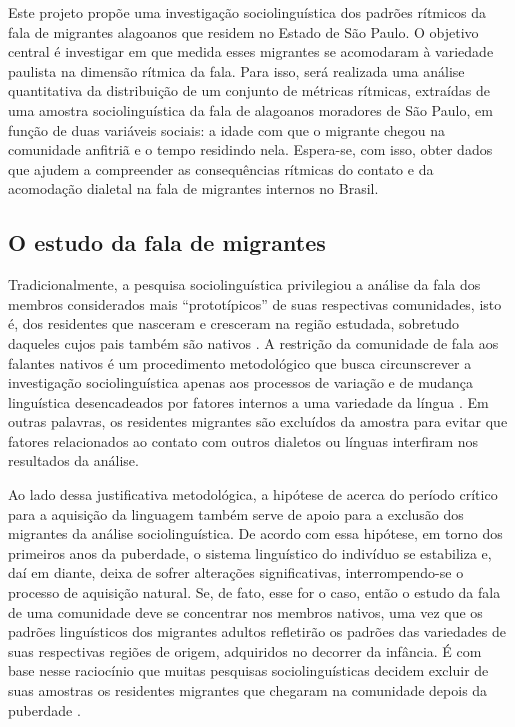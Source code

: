 \documentclass[
	a4paper,	%
	12pt,		%
	]{article}	%
\begin{document}
Este projeto propõe uma investigação sociolinguística dos padrões rítmicos da
fala de migrantes alagoanos que residem no Estado de São Paulo. O objetivo
central é investigar em que medida esses migrantes se acomodaram à variedade
paulista na dimensão rítmica da fala. Para isso, será realizada uma análise
quantitativa da distribuição de um conjunto de métricas rítmicas, extraídas de
uma amostra sociolinguística da fala de alagoanos moradores de São Paulo, em
função de duas variáveis sociais: a idade com que o migrante chegou na
comunidade anfitriã e o tempo residindo nela.  Espera-se, com isso, obter dados
que ajudem a compreender as consequências rítmicas do contato e da acomodação
dialetal na fala de migrantes internos no Brasil.

\subsection{O estudo da fala de migrantes}

Tradicionalmente, a pesquisa sociolinguística privilegiou a análise da fala
dos membros considerados mais \enquote{prototípicos} de suas respectivas
comunidades, isto é, dos residentes que nasceram e cresceram na região
estudada, sobretudo daqueles cujos pais também são nativos
\citep{Britain2018, Oushiro2016, Milroy2002, Kerswill1993}. A restrição da
comunidade de fala aos falantes nativos é um procedimento metodológico que
busca circunscrever a investigação sociolinguística apenas aos processos de
variação e de mudança linguística desencadeados por fatores internos a uma
variedade da língua \citep[][p.  20]{Milroy2002, Labov2001}. Em outras
palavras, os residentes migrantes são excluídos da amostra para evitar que
fatores relacionados ao contato com outros dialetos ou línguas interfiram
nos resultados da análise.

Ao lado dessa justificativa metodológica, a hipótese de \citet{Lenneberg1967}
acerca do período crítico para a aquisição da linguagem também serve de apoio
para a exclusão dos migrantes da análise sociolinguística. De acordo com essa
hipótese, em torno dos primeiros anos da puberdade, o sistema linguístico do
indivíduo se estabiliza e, daí em diante, deixa de sofrer alterações
significativas, interrompendo-se o processo de aquisição natural. Se, de fato,
esse for o caso, então o estudo da fala de uma comunidade deve se concentrar nos
membros nativos, uma vez que os padrões linguísticos dos migrantes adultos
refletirão os padrões das variedades de suas respectivas regiões de origem,
adquiridos no decorrer da infância. É com base nesse raciocínio que muitas
pesquisas sociolinguísticas decidem excluir de suas amostras os residentes
migrantes que chegaram na comunidade depois da puberdade \citep[p. ex.][p.
111]{Labov1966}.
\end{document}
